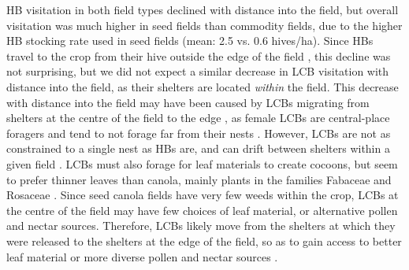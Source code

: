 \documentclass[12pt]{article} %
\begin{document}
HB visitation in both field types declined with distance into the field, but overall visitation was much higher in seed fields than commodity fields, due to the higher HB stocking rate used in seed fields (mean: 2.5 vs. 0.6 hives/ha).
Since HBs travel to the crop from their hive outside the edge of the field \citep{robinson2022}, this decline was not surprising, but we did not expect a similar decrease in LCB visitation with distance into the field, as their shelters are located \textit{within} the field.
This decrease with distance into the field may have been caused by LCBs migrating from shelters at the centre of the field to the edge \citep{goerzen1995}, as female LCBs are central-place foragers and tend to not forage far from their nests \citep{peterson2005,pitts2011, brunet2019}.
However, LCBs are not as constrained to a single nest as HBs are, and can drift between shelters within a given field \citep{goerzen1995, pittsSinger2013}.
LCBs must also forage for leaf materials to create cocoons, but seem to prefer thinner leaves than canola, mainly plants in the families Fabaceae and Rosaceae \citep{sinu2018}.
Since seed canola fields have very few weeds within the crop, LCBs at the centre of the field may have few choices of leaf material, or alternative pollen and nectar sources.
Therefore, LCBs likely move from the shelters at which they were released to the shelters at the edge of the field, so as to gain access to better leaf material or more diverse pollen and nectar sources \citep{horne1995, horne1995b}.
\end{document}
